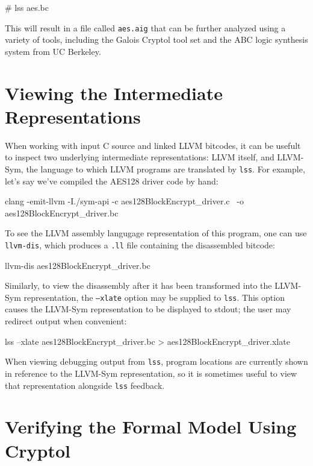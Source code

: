 \documentclass[11pt]{article}
\begin{document}
\begin{code}
# lss aes.bc
\end{code}

This will result in a file called \texttt{aes.aig} that can be further
analyzed using a variety of tools, including the Galois Cryptol tool set
and the ABC logic synthesis system from UC Berkeley.

\section{Viewing the Intermediate Representations}

When working with input C source and linked LLVM bitcodes, it can be
usefult to inspect two underlying intermediate representations: LLVM
itself, and LLVM-Sym, the language to which LLVM programs are translated
by \texttt{lss}.  For example, let's say we've compiled the AES128
driver code by hand:

\begin{code}
clang -emit-llvm -I./sym-api -c aes128BlockEncrypt_driver.c \
  -o aes128BlockEncrypt_driver.bc
\end{code}

To see the LLVM assembly langugage representation of this program, one
can use \texttt{llvm-dis}, which produces a \texttt{.ll} file containing
the disassembled bitcode:

\begin{code}
llvm-dis aes128BlockEncrypt_driver.bc
\end{code}

Similarly, to view the disassembly after it has been transformed into
the LLVM-Sym representation, the \texttt{--xlate} option may be supplied
to \texttt{lss}.  This option causes the LLVM-Sym representation to be
displayed to stdout; the user may redirect output when convenient:

\begin{code}
lss --xlate aes128BlockEncrypt_driver.bc > aes128BlockEncrypt_driver.xlate
\end{code}

When viewing debugging output from \texttt{lss}, program locations are
currently shown in reference to the LLVM-Sym representation, so it is
sometimes useful to view that representation alongside \texttt{lss}
feedback.

\section{Verifying the Formal Model Using Cryptol}
\end{document}
